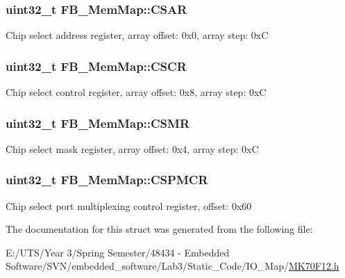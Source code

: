 \subsubsection[{C\+S\+A\+R}]{\setlength{\rightskip}{0pt plus 5cm}uint32\+\_\+t F\+B\+\_\+\+Mem\+Map\+::\+C\+S\+A\+R}\label{struct_f_b___mem_map_aa59ea1aff2f195dc7d41ef8611884381}
Chip select address register, array offset\+: 0x0, array step\+: 0x\+C \hypertarget{struct_f_b___mem_map_a7a1e48a5fde6382a076243009f5c0846}{}
\subsubsection[{C\+S\+C\+R}]{\setlength{\rightskip}{0pt plus 5cm}uint32\+\_\+t F\+B\+\_\+\+Mem\+Map\+::\+C\+S\+C\+R}\label{struct_f_b___mem_map_a7a1e48a5fde6382a076243009f5c0846}
Chip select control register, array offset\+: 0x8, array step\+: 0x\+C \hypertarget{struct_f_b___mem_map_a02c1e1542339e83d168a52e763f60228}{}
\subsubsection[{C\+S\+M\+R}]{\setlength{\rightskip}{0pt plus 5cm}uint32\+\_\+t F\+B\+\_\+\+Mem\+Map\+::\+C\+S\+M\+R}\label{struct_f_b___mem_map_a02c1e1542339e83d168a52e763f60228}
Chip select mask register, array offset\+: 0x4, array step\+: 0x\+C \hypertarget{struct_f_b___mem_map_a7876f1f5e2d0718968b09242af73b600}{}
\subsubsection[{C\+S\+P\+M\+C\+R}]{\setlength{\rightskip}{0pt plus 5cm}uint32\+\_\+t F\+B\+\_\+\+Mem\+Map\+::\+C\+S\+P\+M\+C\+R}\label{struct_f_b___mem_map_a7876f1f5e2d0718968b09242af73b600}
Chip select port multiplexing control register, offset\+: 0x60 

The documentation for this struct was generated from the following file\+:\begin{DoxyCompactItemize}
\item 
E\+:/\+U\+T\+S/\+Year 3/\+Spring Semester/48434 -\/ Embedded Software/\+S\+V\+N/embedded\+\_\+software/\+Lab3/\+Static\+\_\+\+Code/\+I\+O\+\_\+\+Map/\hyperlink{_m_k70_f12_8h}{M\+K70\+F12.\+h}\end{DoxyCompactItemize}
